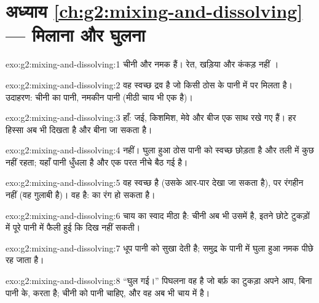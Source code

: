 \section*{अध्याय \ref{ch:g2:mixing-and-dissolving} --- मिलाना और घुलना}

\begin{solution}{exo:g2:mixing-and-dissolving:1}
चीनी और नमक  हैं। रेत, खड़िया और कंकड़ नहीं ।
\end{solution}

\begin{solution}{exo:g2:mixing-and-dissolving:2}
 वह स्वच्छ द्रव है जो किसी ठोस के पानी में  पर मिलता है।
उदाहरण: चीनी का पानी, नमकीन पानी (मीठी चाय भी एक  है)।
\end{solution}

\begin{solution}{exo:g2:mixing-and-dissolving:3}
हाँ: जई, किशमिश, मेवे और बीज एक साथ रखे गए हैं। हर हिस्सा अब भी
दिखता है और बीना जा सकता है।
\end{solution}

\begin{solution}{exo:g2:mixing-and-dissolving:4}
नहीं। घुला हुआ ठोस पानी को स्वच्छ छोड़ता है और तली में कुछ नहीं रहता;
यहाँ पानी धुँधला है और एक परत नीचे बैठ गई है।
\end{solution}

\begin{solution}{exo:g2:mixing-and-dissolving:5}
वह स्वच्छ है (उसके आर-पार देखा जा सकता है), पर रंगहीन नहीं (वह गुलाबी है)। वह
 है:  का रंग हो सकता है।
\end{solution}

\begin{solution}{exo:g2:mixing-and-dissolving:6}
चाय का स्वाद मीठा है: चीनी अब भी उसमें है, इतने छोटे टुकड़ों में
पूरे पानी में फैली हुई कि दिख नहीं सकती।
\end{solution}

\begin{solution}{exo:g2:mixing-and-dissolving:7}
धूप पानी को सुखा देती है; समुद्र के पानी में घुला हुआ नमक पीछे
रह जाता है।
\end{solution}

\begin{solution}{exo:g2:mixing-and-dissolving:8}
``घुल गई।'' पिघलना वह है जो बर्फ़ का टुकड़ा अपने आप, बिना पानी के,
करता है; चीनी को पानी चाहिए, और वह अब भी चाय में है।
\end{solution}

